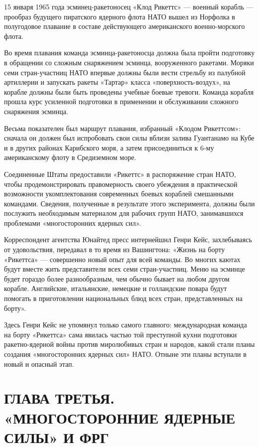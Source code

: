 \documentclass[12pt, a4paper, openany]{book}
\begin{document}
	15 января 1965 года эсминец-ракетоносец «Клод Рикеттс» — военный корабль — прообраз будущего пиратского ядерного флота НАТО вышел из Норфолка в полугодовое плавание в составе действующего американского военно-морского флота.
	
	Во время плавания команда эсминца-ракетоносца должна была пройти подготовку в обращении со сложным снаряжением эсминца, вооруженного ракетами. Моряки семи стран-участниц НАТО впервые должны были вести стрельбу из палубной артиллерии и запускать ракеты «Тартар» класса «поверхность-воздух», на корабле должны были быть проведены учебные боевые тревоги. Команда корабля прошла курс усиленной подготовки в применении и обслуживании сложного снаряжения эсминца.
	
	Весьма показателен был маршрут плавания, избранный «Клодом Рикеттсом»: сначала он должен был испробовать свои силы вблизи залива Гуантанамо на Кубе и в других районах Карибского моря, а затем присоединиться к 6-му американскому флоту в Средиземном море.
	
	Соединенные Штаты предоставили «Рикеттс» в распоряжение стран НАТО, чтобы продемонстрировать правомерность своего убеждения в практической возможности укомплектования современных боевых кораблей смешанными командами. Сведения, полученные в результате этого эксперимента, должны были послужить необходимым материалом для рабочих групп НАТО, занимавшихся проблемами «многосторонних ядерных сил».
	
	Корреспондент агентства Юнайтед пресс интернейшнл Генри Кейс, захлебываясь от удовольствия, передавал в то время из Вашингтона: «Жизнь на борту «Рикеттса» — совершенно новый опыт для всей команды. Во многих каютах будут вместе жить представители всех семи стран-участниц. Меню на эсминце будет гораздо более разнообразным, чем обычно бывает на любом другом корабле. Английские, итальянские, немецкие и голландские повара будут помогать в приготовлении национальных блюд всех стран, представленных на борту».
	
	Здесь Генри Кейс не упомянул только самого главного: международная команда на борту «Рикеттса» сама явилась частью той преступной кухни подготовки ракетно-ядерной войны против миролюбивых стран и народов, какой стали планы создания «многосторонних ядерных сил» НАТО. Отныне эти планы вступали в новый и опасный этап.
	
			\newpage
	\section[Глава третья. «МНОГОСТОРОННИЕ ЯДЕРНЫЕ СИЛЫ» И ФРГ]{\center ГЛАВА ТРЕТЬЯ.\\ \textbf{«МНОГОСТОРОННИЕ ЯДЕРНЫЕ СИЛЫ» И ФРГ}}	
\end{document}
